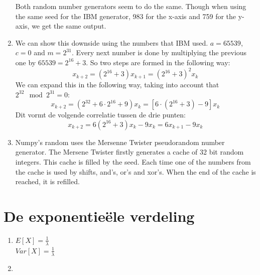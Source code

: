 \documentclass[a4paper,12px]{article}
\begin{document}
\begin{enumerate}
\begin{figure}[!h]
        \end{figure}
        \FloatBarrier
        Both random number generators seem to do the same. Though when using
        the same seed for the IBM generator, 983 for the x-axis and 759 for
        the y-axis, we get the same output.
    \item %
        We can show this downside using the numbers that IBM used. $a=65539$,
        $c=0$ and $m=2^{31}$. Every next number is done by multiplying the
        previous one by $65539=2^{16}+3$. So two steps are formed in the
        following way:
        \begin{equation}x_{k+2}=(2^{16}+3) x_{k+1}=(2^{16}+3 )^2 x_{k}\,\end{equation}
        We can expand this in the following way, taking into account that
        $2^{32}\mod2^{31}=0$:
        \begin{equation}x_{k+2}=(2^{32}+6 \cdot2^{16} +9 )x_{k}=[6 \cdot (2^{16}+3)-9]x_{k}\,\end{equation}
        Dit vormt de volgende correlatie tussen de drie punten:
        \begin{equation}x_{k+2}=6(2^{16}+3)x_{k}-9x_{k}=6x_{k+1}-9x_{k}\,\end{equation}
    \item Numpy's random uses the Mersenne Twister pseudorandom number generator. 
        The Mersene Twister firstly generates a cache of 32 bit random
        integers. This cache is filled by the seed. Each time one of the
        numbers from the cache is used by shifts, and's, or's and xor's.
        When the end of the cache is reached, it is refilled.
\end{enumerate}
\section{De exponentie\"ele verdeling}

\begin{enumerate}
    \item $E[X] = \frac{1}{\lambda}$\\
        $Var[X] = \frac{1}{\lambda}$
    \item
\end{enumerate}


% 
% 
\end{document}
